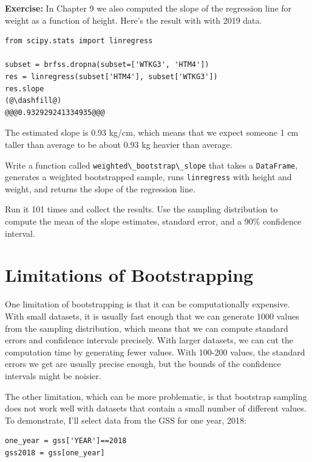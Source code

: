 \textbf{Exercise:} In Chapter 9 we also computed the slope of the
regression line for weight as a function of height. Here's the result
with with 2019 data.

\begin{lstlisting}[]
from scipy.stats import linregress

subset = brfss.dropna(subset=['WTKG3', 'HTM4'])
res = linregress(subset['HTM4'], subset['WTKG3'])
res.slope
(@\dashfill@)
@@@0.932929241334935@@@
\end{lstlisting}

The estimated slope is 0.93 kg/cm, which means that we expect someone 1
cm taller than average to be about 0.93 kg heavier than average.

Write a function called
\passthrough{\lstinline!weighted\_bootstrap\_slope!} that takes a
\passthrough{\lstinline!DataFrame!}, generates a weighted bootstrapped
sample, runs \passthrough{\lstinline!linregress!} with height and
weight, and returns the slope of the regression line.

Run it 101 times and collect the results. Use the sampling distribution
to compute the mean of the slope estimates, standard error, and a 90\%
confidence interval.

\hypertarget{limitations-of-bootstrapping}{%
\section{Limitations of
Bootstrapping}\label{limitations-of-bootstrapping}}

One limitation of bootstrapping is that it can be computationally
expensive. With small datasets, it is usually fast enough that we can
generate 1000 values from the sampling distribution, which means that we
can compute standard errors and confidence intervals precisely. With
larger datasets, we can cut the computation time by generating fewer
values. With 100-200 values, the standard errors we get are usually
precise enough, but the bounds of the confidence intervals might be
noisier.

The other limitation, which can be more problematic, is that bootstrap
sampling does not work well with datasets that contain a small number of
different values. To demonstrate, I'll select data from the GSS for one
year, 2018:

\begin{lstlisting}[]
one_year = gss['YEAR']==2018
gss2018 = gss[one_year]
\end{lstlisting}

